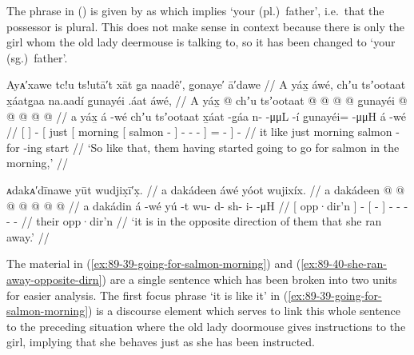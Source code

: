 The phrase  in (\lastx) is given by \citeauthor{swanton:1909} as  which implies  ‘your (pl.)\ father’, i.e.\ that the possessor is plural.
This does not make sense in context because there is only the girl whom the old lady deermouse is talking to, so it has been changed to  ‘your (sg.)\ father’.

\ex\label{ex:89-39-going-for-salmon-morning}%
%
\begingl
	\glpreamble	Ayᴀ′xawe tc!u ts!utā′t xāt g̣a naadê′, g̣onaye′ ā′dawe //
	\glpreamble	A yáx̱ áwé, chʼu tsʼootaat x̱áatg̱aa na.aadí g̱unayéi .áat áwé, //
	\gla	{} A yáx̱ {}
		 @ {}
		{} chʼu {} tsʼootaat
			{}  @ {} {}
			 @ {} @ {} @ {} {}
		g̱unayéi @  @ {} @ {} @ {} {}
		 @ {} //
	\glb	{} a yáx̱ {}
		á -wé
		{} chʼu {} tsʼootaat
			{} x̱áat -g̱áa {}
			n-  -μμL -í {}
		g̱unayéi= {}  -μμH {} {}
		á -wé //
	\glc	{}[   {}]
		 -
		{}[ just {}[ morning
			{}[ salmon - {}]
			-  - - {}]
		= \·  - \· {}]
		 - //
	\gld	{} it like {}
		 {}
		{} just {} morning
			{} salmon -for {}
			 {} {} -ing {}
		start  {} {} {} {}
		 {} //
	\glft	‘So like that, them having started going to go for salmon in the morning,’
		//
\endgl
\xe 

\ex\label{ex:89-40-she-ran-away-opposite-dirn}%
%
\begingl
	\glpreamble	ᴀdakᴀ′dīnawe yūt wudjix̣ī′x̣. //
	\glpreamble	a dakádeen áwé yóot wujixíx. //
	\gla	{} a dakádeen {}
		 @ {}
		{}  @ {} {}
		 @ {} @ {} @ {} @ {} @ {} //
	\glb	{} a dakádin {}
		á -wé
		{} yú -t {}
		wu- d- sh- i-  -μH //
	\glc	{}[  opp·dir’n {}]
		 -
		{}[  - {}]
		- - - -  - //
	\gld	{} their opp·dir’n {}
		 {}
		{}  {} {}
		 {} {} {} {} {} //
	\glft	‘it is in the opposite direction of them that she ran away.’
		//
\endgl
\xe

The material in (\ref{ex:89-39-going-for-salmon-morning}) and (\ref{ex:89-40-she-ran-away-opposite-dirn}) are a single sentence which has been broken into two units for easier analysis.
The first focus phrase  ‘it is like it’ in (\ref{ex:89-39-going-for-salmon-morning}) is a discourse element which serves to link this whole sentence to the preceding situation where the old lady doormouse gives instructions to the girl, implying that she behaves just as she has been instructed.

